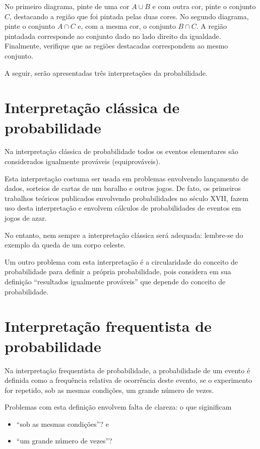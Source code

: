 No primeiro diagrama, pinte de uma cor \(A\cup B\) e com outra cor, pinte o conjunto \(C\), destacando a região que foi pintada pelas duas cores. No segundo diagrama, pinte o conjunto \(A\cap C\) e, com a mesma cor,  o conjunto \(B\cap C\). A região pintadada corresponde ao conjunto dado no lado direito da igualdade. Finalmente, verifique que as regiões destacadas correspondem ao mesmo conjunto.

A seguir, serão apresentadas três interpretações da probabilidade.


\section{Interpretação clássica de probabilidade}

Na interpretação clássica de probabilidade todos os eventos elementares são considerados igualmente prováveis (equiprováveis).

Esta interpretação costuma ser usada em problemas envolvendo lançamento de dados, sorteios de cartas de um baralho e outros jogos. De fato, os primeiros trabalhos teóricos publicados envolvendo probabilidades no século XVII, fazem uso desta interpretação e envolvem cálculos de probabilidades de eventos em jogos de azar.

No entanto, nem sempre a interpretação clássica será adequada: lembre-se do exemplo da queda de um corpo celeste.

Um outro problema com esta interpretação é a circularidade do conceito de probabilidade para definir a própria probabilidade, pois considera em sua definição “resultados igualmente prováveis”{} que depende do conceito de probabilidade.

\section{Interpretação frequentista de probabilidade}

Na interpretação frequentista de probabilidade, a probabilidade de um evento é definida como a frequência relativa de ocorrência deste evento, se o experimento for repetido, sob as mesmas condições, um grande número de vezes.

Problemas com esta definição envolvem falta de clareza: o que siginificam
\begin{itemize}
\item {} 
“sob as mesmas condições”? e

\item {} 
“um grande número de vezes”?

\end{itemize}

